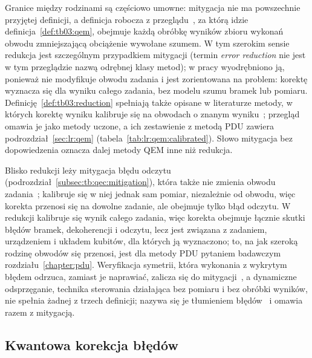 Granice między rodzinami są częściowo umowne: mitygacja nie ma powszechnie przyjętej definicji, a definicja robocza z przeglądu~\cite{cai2023quantum}, za którą idzie definicja~\ref{def:tb03:qem}, obejmuje każdą obróbkę wyników zbioru wykonań obwodu zmniejszającą obciążenie wywołane szumem.
W tym szerokim sensie redukcja jest szczególnym przypadkiem mitygacji (termin \emph{error reduction} nie jest w tym przeglądzie nazwą odrębnej klasy metod); w pracy wyodrębniono ją, ponieważ nie modyfikuje obwodu zadania i jest zorientowana na problem: korektę wyznacza się dla wyniku całego zadania, bez modelu szumu bramek lub pomiaru.
Definicję~\ref{def:tb03:reduction} spełniają także opisane w literaturze metody, w których korektę wyniku kalibruje się na obwodach o znanym wyniku~\cite{jattana_general_2020,czarnik_error_2021,lolur_reference-state_2023}; przegląd~\cite{cai2023quantum} omawia je jako metody uczone, a ich zestawienie z metodą PDU zawiera podrozdział~\ref{sec:lr:qem} (tabela~\ref{tab:lr:qem:calibrated}).
Słowo mitygacja bez dopowiedzenia oznacza dalej metody QEM inne niż redukcja.

Blisko redukcji leży mitygacja błędu odczytu (podrozdział~\ref{subsec:tb:qec:mitigation}), która także nie zmienia obwodu zadania~\cite{maciejewski_mitigation_2020,bravyi_mitigating_2021}; kalibruje się w niej jednak sam pomiar, niezależnie od obwodu, więc korekta przenosi się na dowolne zadanie, ale obejmuje tylko błąd odczytu.
W redukcji kalibruje się wynik całego zadania, więc korekta obejmuje łącznie skutki błędów bramek, dekoherencji i odczytu, lecz jest związana z zadaniem, urządzeniem i układem kubitów, dla których ją wyznaczono; to, na jak szeroką rodzinę obwodów się przenosi, jest dla metody PDU pytaniem badawczym rozdziału~\ref{chapter:pdu}.
Weryfikacja symetrii, która wykonania z wykrytym błędem odrzuca, zamiast je naprawiać, zalicza się do mitygacji~\cite{cai2023quantum}, a dynamiczne odsprzęganie, technika sterowania działająca bez pomiaru i bez obróbki wyników, nie spełnia żadnej z trzech definicji; nazywa się je tłumieniem błędów~\cite{ezzell_dynamical_2023} i omawia razem z mitygacją.

\subsection{Kwantowa korekcja błędów}\label{subsec:tb:qec:codes}

